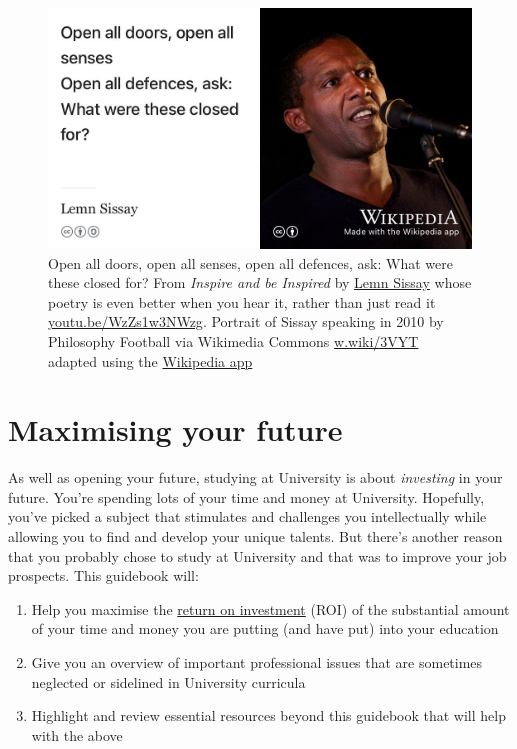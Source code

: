 \documentclass[
]{book}
\providecommand{\tightlist}{%
  \setlength{\itemsep}{0pt}\setlength{\parskip}{0pt}}
\begin{document}
\begin{figure}

{\centering \includegraphics[width=0.99\linewidth]{images/lemninspire} 

}

\caption{Open all doors, open all senses, open all defences, ask: What were these closed for? From \emph{Inspire and be Inspired} by \href{https://en.wikipedia.org/wiki/Lemn_Sissay}{Lemn Sissay} whose poetry is even better when you hear it, rather than just read it \href{https://youtu.be/WzZs1w3NWzg}{youtu.be/WzZs1w3NWzg}. \citep{sissay} Portrait of Sissay speaking in 2010 by Philosophy Football via Wikimedia Commons \href{https://w.wiki/3VYT}{w.wiki/3VYT} adapted using the \href{https://apps.apple.com/gb/app/wikipedia/id324715238}{Wikipedia app}}\label{fig:lemn-fig}
\end{figure}



\hypertarget{roi}{%
\section{Maximising your future}\label{roi}}

As well as opening your future, studying at University is about \emph{investing} in your future. You're spending lots of your time and money at University. Hopefully, you've picked a subject that stimulates and challenges you intellectually while allowing you to find and develop your unique talents. But there's another reason that you probably chose to study at University and that was to improve your job prospects. This guidebook will:

\begin{enumerate}
\def\labelenumi{\arabic{enumi}.}
\tightlist
\item
  Help you maximise the \href{https://en.wikipedia.org/wiki/Return_on_investment}{return on investment} (ROI) of the substantial amount of your time and money you are putting (and have put) into your education
\item
  Give you an overview of important professional issues that are sometimes neglected or sidelined in University curricula
\item
  Highlight and review essential resources beyond this guidebook that will help with the above
\end{enumerate}
\end{document}
